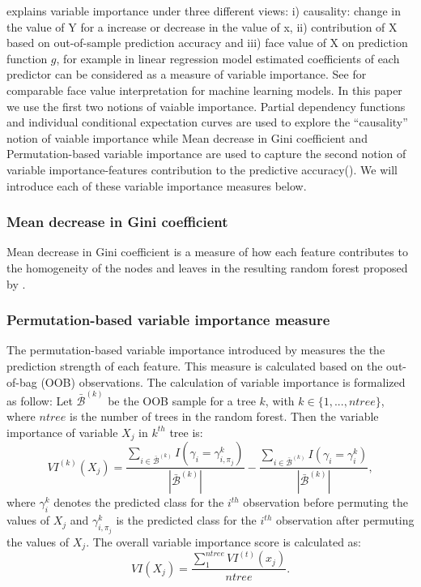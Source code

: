 \documentclass[11pt,a4paper,]{article}
\theoremstyle{definition}
\theoremstyle{definition}
\theoremstyle{definition}
\theoremstyle{remark}
\begin{document}
\textcite{jiang2002} explains variable importance under three different
views: i) causality: change in the value of Y for a increase or decrease
in the value of x, ii) contribution of X based on out-of-sample
prediction accuracy and iii) face value of X on prediction function
\(g\), for example in linear regression model estimated coefficients of
each predictor can be considered as a measure of variable importance.
See \textcite{jiang2002} for comparable face value interpretation for
machine learning models. In this paper we use the first two notions of
vaiable importance. Partial dependency functions and individual
conditional expectation curves are used to explore the ``causality''
notion of vaiable importance while Mean decrease in Gini coefficient and
Permutation-based variable importance are used to capture the second
notion of variable importance-features contribution to the predictive
accuracy(\textcite{Zhao}). We will introduce each of these variable
importance measures below.

\subsubsection{Mean decrease in Gini
coefficient}\label{mean-decrease-in-gini-coefficient}

Mean decrease in Gini coefficient is a measure of how each feature
contributes to the homogeneity of the nodes and leaves in the resulting
random forest proposed by \textcite{breiman2001random}.

\subsubsection{Permutation-based variable importance
measure}\label{permutation-based-variable-importance-measure}

The permutation-based variable importance introduced by
\textcite{breiman2001random} measures the the prediction strength of
each feature. This measure is calculated based on the out-of-bag (OOB)
observations. The calculation of variable importance is formalized as
follow: Let \(\bar{\mathcal{B}}^{(k)}\) be the OOB sample for a tree
\(k\), with \(k\in \{1,...,ntree\}\), where \(ntree\) is the number of
trees in the random forest. Then the variable importance of variable
\(X_{j}\) in \(k^{th}\) tree is:
\[VI^{(k)}(X_{j})=\frac{\sum_{i\in \bar{\mathcal{B}}^{(k)}}I(\gamma_{i}=\gamma_{i,\pi_{j}}^{k})}{|\bar{\mathcal{B}}^{(k)}|}-\frac{\sum_{i\in \bar{\mathcal{B}}^{(k)}}I(\gamma_{i}=\gamma_{i}^{k})}{|\bar{\mathcal{B}}^{(k)}|},\]
where \(\gamma_{i}^{k}\) denotes the predicted class for the \(i^{th}\)
observation before permuting the values of \(X_{j}\) and
\(\gamma_{i, \pi_{j}}^{k}\) is the predicted class for the \(i^{th}\)
observation after permuting the values of \(X_{j}\). The overall
variable importance score is calculated as:
\[VI(X_{j})=\frac{\sum_{1}^{ntree}VI^{(t)}(x_{j})}{ntree}.\]
\end{document}
